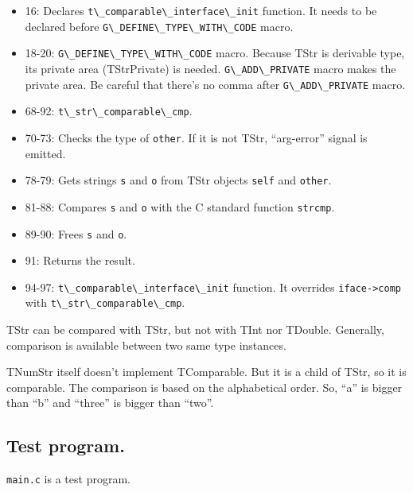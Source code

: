 \begin{itemize}
\tightlist
\item
  16: Declares \passthrough{\lstinline!t\_comparable\_interface\_init!}
  function. It needs to be declared before
  \passthrough{\lstinline!G\_DEFINE\_TYPE\_WITH\_CODE!} macro.
\item
  18-20: \passthrough{\lstinline!G\_DEFINE\_TYPE\_WITH\_CODE!} macro.
  Because TStr is derivable type, its private area (TStrPrivate) is
  needed. \passthrough{\lstinline!G\_ADD\_PRIVATE!} macro makes the
  private area. Be careful that there's no comma after
  \passthrough{\lstinline!G\_ADD\_PRIVATE!} macro.
\item
  68-92: \passthrough{\lstinline!t\_str\_comparable\_cmp!}.
\item
  70-73: Checks the type of \passthrough{\lstinline!other!}. If it is
  not TStr, ``arg-error'' signal is emitted.
\item
  78-79: Gets strings \passthrough{\lstinline!s!} and
  \passthrough{\lstinline!o!} from TStr objects
  \passthrough{\lstinline!self!} and \passthrough{\lstinline!other!}.
\item
  81-88: Compares \passthrough{\lstinline!s!} and
  \passthrough{\lstinline!o!} with the C standard function
  \passthrough{\lstinline!strcmp!}.
\item
  89-90: Frees \passthrough{\lstinline!s!} and
  \passthrough{\lstinline!o!}.
\item
  91: Returns the result.
\item
  94-97: \passthrough{\lstinline!t\_comparable\_interface\_init!}
  function. It overrides \passthrough{\lstinline!iface->comp!} with
  \passthrough{\lstinline!t\_str\_comparable\_cmp!}.
\end{itemize}

TStr can be compared with TStr, but not with TInt nor TDouble.
Generally, comparison is available between two same type instances.

TNumStr itself doesn't implement TComparable. But it is a child of TStr,
so it is comparable. The comparison is based on the alphabetical order.
So, ``a'' is bigger than ``b'' and ``three'' is bigger than ``two''.

\subsection{Test program.}\label{test-program.}

\passthrough{\lstinline!main.c!} is a test program.

